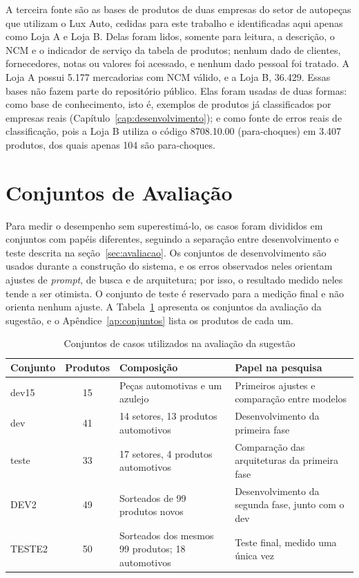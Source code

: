 A terceira fonte são as bases de produtos de duas empresas do setor de autopeças que utilizam o Lux Auto, cedidas para este trabalho e identificadas aqui apenas como Loja A e Loja B. Delas foram lidos, somente para leitura, a descrição, o NCM e o indicador de serviço da tabela de produtos; nenhum dado de clientes, fornecedores, notas ou valores foi acessado, e nenhum dado pessoal foi tratado. A Loja A possui 5.177 mercadorias com NCM válido, e a Loja B, 36.429. Essas bases não fazem parte do repositório público. Elas foram usadas de duas formas: como base de conhecimento, isto é, exemplos de produtos já classificados por empresas reais (Capítulo~\ref{cap:desenvolvimento}); e como fonte de erros reais de classificação, pois a Loja B utiliza o código 8708.10.00 (para-choques) em 3.407 produtos, dos quais apenas 104 são para-choques.

\section{Conjuntos de Avaliação}

Para medir o desempenho sem superestimá-lo, os casos foram divididos em conjuntos com papéis diferentes, seguindo a separação entre desenvolvimento e teste descrita na seção~\ref{sec:avaliacao}. Os conjuntos de desenvolvimento são usados durante a construção do sistema, e os erros observados neles orientam ajustes de \textit{prompt}, de busca e de arquitetura; por isso, o resultado medido neles tende a ser otimista. O conjunto de teste é reservado para a medição final e não orienta nenhum ajuste. A Tabela~\ref{tab:conjuntos} apresenta os conjuntos da avaliação da sugestão, e o Apêndice~\ref{ap:conjuntos} lista os produtos de cada um.

\begin{table}[H]
\centering
\caption{Conjuntos de casos utilizados na avaliação da sugestão}
\label{tab:conjuntos}
\begin{tabular}{p{1.8cm} c p{4.6cm} p{6.1cm}}
\hline
\textbf{Conjunto} & \textbf{Produtos} & \textbf{Composição} & \textbf{Papel na pesquisa} \\
\hline
dev15 & 15 & Peças automotivas e um azulejo & Primeiros ajustes e comparação entre modelos \\
dev & 41 & 14 setores, 13 produtos automotivos & Desenvolvimento da primeira fase \\
teste & 33 & 17 setores, 4 produtos automotivos & Comparação das arquiteturas da primeira fase \\
DEV2 & 49 & Sorteados de 99 produtos novos & Desenvolvimento da segunda fase, junto com o dev \\
TESTE2 & 50 & Sorteados dos mesmos 99 produtos; 18 automotivos & Teste final, medido uma única vez \\
\hline
\end{tabular}
\end{table}

